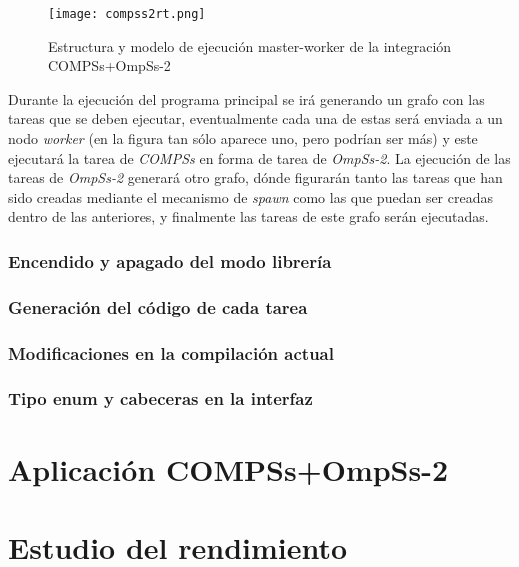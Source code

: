 \begin{figure}[H]
    \centering 
    \caption{Estructura y modelo de ejecución master-worker de la integración COMPSs+OmpSs-2}
    \texttt{[image: compss2rt.png]}
    \label{fig:compssompssrt}
\end{figure}

Durante la ejecución del programa principal se irá generando un grafo con las tareas que se deben ejecutar, eventualmente cada una de estas será enviada a un nodo \textit{worker} (en la figura tan sólo aparece uno, pero podrían ser más) y este ejecutará la tarea de \textit{COMPSs} en forma de tarea de \textit{OmpSs-2}.
La ejecución de las tareas de \textit{OmpSs-2} generará otro grafo, dónde figurarán tanto las tareas que han sido creadas mediante el mecanismo de \textit{spawn} como las que puedan ser creadas dentro de las anteriores, y finalmente las tareas de este grafo serán ejecutadas.

\subsubsection{Encendido y apagado del modo librería}


\subsubsection{Generación del código de cada tarea}


\subsubsection{Modificaciones en la compilación actual}


\subsubsection{Tipo enum y cabeceras en la interfaz}


\section{Aplicación COMPSs+OmpSs-2}



\section{Estudio del rendimiento}































